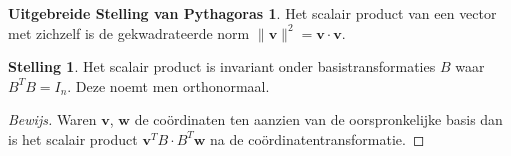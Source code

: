 \documentclass{amsart}
\theoremstyle{definition}
\newtheorem{thm}{Stelling}[section]
\newenvironment{bewijs}{\begin{proof}[Bewijs]}{\end{proof}}
\newcommand{\norm}[1]{\lVert{#1}\rVert}
\newcommand{\vvec}[1][v]{\mathbf{#1}}
\newcommand{\vnorm}[1]{\norm{\vvec[#1]}}
\begin{document}
\newtheorem*{pyth}{Uitgebreide Stelling van Pythagoras}
\begin{pyth}
	Het scalair product van een vector met zichzelf is de gekwadrateerde norm $\vnorm v^2 = \vvec\cdot\vvec$.
\end{pyth}

\begin{thm}
	Het scalair product is invariant onder basistransformaties $B$ waar $B^TB=I_n$. Deze noemt men orthonormaal.
	\begin{bewijs}
		Waren $\vvec$, $\vvec[w]$ de coördinaten ten aanzien van de oorspronkelijke basis dan is het scalair product $\vvec^T B\cdot B^T\vvec[w]$ na de coördinatentransformatie.
	\end{bewijs}
\end{thm}

\newpage
\end{document}
